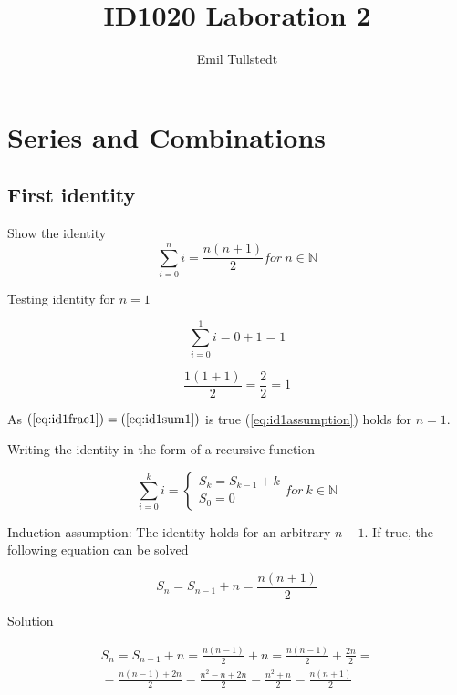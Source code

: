 \documentclass[a4paper,11pt]{article}
\title{ID1020 Laboration 2}
\author{Emil Tullstedt}
\begin{document}
\maketitle

\newpage

\tableofcontents

\newpage

\section{Series and Combinations}
\label{sec:sac}

\subsection{First identity}

Show the identity
\begin{equation} \label{eq:id1assumption}
\sum_{i=0}^n i = \frac{n(n+1)}{2} for\ n \in \mathbb{N}
\end{equation}

Testing identity for $n = 1$

\begin{equation} \label{eq:id1sum1}
\sum_{i=0}^1i = 0 + 1 = 1
\end{equation}

\begin{equation} \label{eq:id1frac1}
\frac{1(1+1)}{2} = \frac{2}{2} = 1
\end{equation}

As $(\ref{eq:id1frac1}) = (\ref{eq:id1sum1})$ is true (\ref{eq:id1assumption}) holds for $n = 1$.

Writing the identity in the form of a recursive function

\begin{equation}
\sum_{i=0}^ki = 
	\begin{cases}
		S_k = S_{k-1} + k\\
		S_0 = 0
	\end{cases} for\ k \in \mathbb{N}
\end{equation}

Induction assumption: The identity holds for an arbitrary $n-1$.
If true, the following equation can be solved

\begin{equation}
S_n = S_{n-1} + n = \frac{n(n + 1)}{2}
\end{equation}

Solution

\begin{equation}
\begin{split}
S_n = S_{n-1} + n = \frac{n(n-1)}{2} + n = \frac{n(n-1)}{2} + \frac{2n}{2} = \\ = \frac{n(n-1) + 2n}{2} = \frac{n^2-n + 2n}{2} = \frac{n^2 + n}{2} = \frac{n(n + 1)}{2}
\end{split}
\end{equation}
\end{document}
